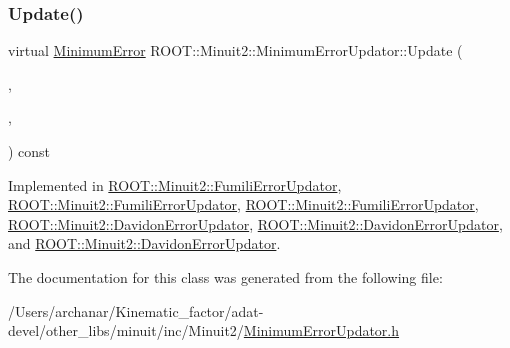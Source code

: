 \subsubsection{\texorpdfstring{Update()}{Update()}\hspace{0.1cm}{\footnotesize\ttfamily [3/3]}}
{\footnotesize\ttfamily virtual \mbox{\hyperlink{classROOT_1_1Minuit2_1_1MinimumError}{Minimum\+Error}} R\+O\+O\+T\+::\+Minuit2\+::\+Minimum\+Error\+Updator\+::\+Update (\begin{DoxyParamCaption}\item[{const \mbox{\hyperlink{classROOT_1_1Minuit2_1_1MinimumState}{Minimum\+State}} \&}]{,  }\item[{const \mbox{\hyperlink{classROOT_1_1Minuit2_1_1MinimumParameters}{Minimum\+Parameters}} \&}]{,  }\item[{const \mbox{\hyperlink{classROOT_1_1Minuit2_1_1FunctionGradient}{Function\+Gradient}} \&}]{ }\end{DoxyParamCaption}) const\hspace{0.3cm}{\ttfamily [pure virtual]}}



Implemented in \mbox{\hyperlink{classROOT_1_1Minuit2_1_1FumiliErrorUpdator_ae5ee7f2052c474169dd19ffbc3755bd3}{R\+O\+O\+T\+::\+Minuit2\+::\+Fumili\+Error\+Updator}}, \mbox{\hyperlink{classROOT_1_1Minuit2_1_1FumiliErrorUpdator_a7a634a18816d8cdc6db8d92b27b69095}{R\+O\+O\+T\+::\+Minuit2\+::\+Fumili\+Error\+Updator}}, \mbox{\hyperlink{classROOT_1_1Minuit2_1_1FumiliErrorUpdator_a7a634a18816d8cdc6db8d92b27b69095}{R\+O\+O\+T\+::\+Minuit2\+::\+Fumili\+Error\+Updator}}, \mbox{\hyperlink{classROOT_1_1Minuit2_1_1DavidonErrorUpdator_afad671aa523cbd9f17af376c51c3ce97}{R\+O\+O\+T\+::\+Minuit2\+::\+Davidon\+Error\+Updator}}, \mbox{\hyperlink{classROOT_1_1Minuit2_1_1DavidonErrorUpdator_aae088602f78dc3bee91f7ce2534311e9}{R\+O\+O\+T\+::\+Minuit2\+::\+Davidon\+Error\+Updator}}, and \mbox{\hyperlink{classROOT_1_1Minuit2_1_1DavidonErrorUpdator_aae088602f78dc3bee91f7ce2534311e9}{R\+O\+O\+T\+::\+Minuit2\+::\+Davidon\+Error\+Updator}}.



The documentation for this class was generated from the following file\+:\begin{DoxyCompactItemize}
\item 
/\+Users/archanar/\+Kinematic\+\_\+factor/adat-\/devel/other\+\_\+libs/minuit/inc/\+Minuit2/\mbox{\hyperlink{adat-devel_2other__libs_2minuit_2inc_2Minuit2_2MinimumErrorUpdator_8h}{Minimum\+Error\+Updator.\+h}}\end{DoxyCompactItemize}
